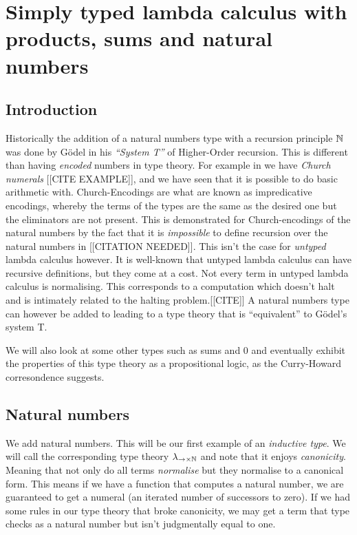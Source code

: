 \section{Simply typed lambda calculus with products, sums and natural numbers}

\subsection{Introduction}

Historically the addition of a natural numbers type with a recursion principle $\mathbb{N}$ was done by G\"odel in his \emph{``System T''} of Higher-Order recursion. This is different than having \emph{encoded} numbers in type theory. For example in \stlc we have \emph{Church numerals} [[CITE EXAMPLE]], and we have seen that it is possible to do basic arithmetic with. Church-Encodings are what are known as impredicative encodings, whereby the terms of the types are the same as the desired one but the eliminators are not present. This is demonstrated for Church-encodings of the natural numbers by the fact that it is \emph{impossible} to define recursion over the natural numbers in \stlc \cite{a} [[CITATION NEEDED]]. This isn't the case for \emph{untyped} lambda calculus however. It is well-known that untyped lambda calculus can have recursive definitions, but they come at a cost. Not every term in untyped lambda calculus is normalising. This corresponds to a computation which doesn't halt and is intimately related to the halting problem.[[CITE]] A natural numbers type can however be added to \stlc leading to a type theory that is ``equivalent'' to G\"odel's system T.

We will also look at some other types such as sums and $0$ and eventually exhibit the properties of this type theory as a propositional logic, as the Curry-Howard corresondence suggests.

\subsection{Natural numbers}

We add natural numbers. This will be our first example of an \emph{inductive type}. We will call the corresponding type theory $\lambda_{\to \times \mathbb{N}}$ and note that it enjoys \emph{canonicity}. Meaning that not only do all terms \emph{normalise} but they normalise to a canonical form. This means if we have a function that computes a natural number, we are guaranteed to get a numeral (an iterated number of successors to zero). If we had some rules in our type theory that broke canonicity, we may get a term that type checks as a natural number but isn't judgmentally equal to one.

